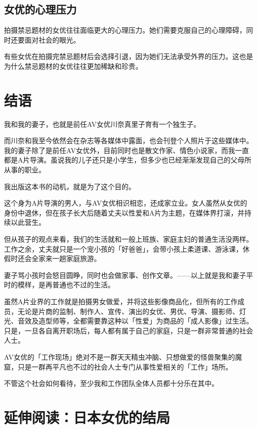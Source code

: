\documentclass[12pt,UTF8]{ctexbook}
\begin{document}
\section{女优的心理压力}

拍摄禁忌题材的女优往往面临更大的心理压力。她们需要克服自己的心理障碍，同时还要面对社会的眼光。

有些女优在拍摄完禁忌题材后会选择引退，因为她们无法承受外界的压力。这也是为什么禁忌题材的女优往往更加稀缺和珍贵。

\backmatter

\chapter{结语}

我和我的妻子，也就是前任AV女优川奈真里子育有一个独生子。

而川奈和我至今依然会在杂志等各媒体中露面，也会刊登个人照片于这些媒体中。我的妻子除了是前任AV女优外，目前同时也是散文作家、情色小说家，而我一直都是A片导演。虽说我的儿子还只是小学生，但多少也已经渐渐发现自己的父母所从事的职业。

我出版这本书的动机，就是为了这个目的。

这个身为A片导演的男人，与AV女优相识相恋，还成家立业。女人虽然从女优的身份中退休，但在孩子长大后随着丈夫以性爱和A片为主题，在媒体界打滚，并持续以此营生。

但从孩子的观点来看，我们的生活就和一般上班族、家庭主妇的普通生活没两样。工作之余，丈夫就只是一个宠小孩的「好爸爸」，会带小孩上柔道课、游泳课，休假时还会全家来一趟家庭旅游。

妻子骂小孩时会怒目圆睁，同时也会做家事、创作文章。——以上就是我和妻子平时的模样，是再普通也不过的生活。

虽然A片业界的工作就是拍摄男女做爱，并将这些影像商品化，但所有的工作成员，无论是片商的监制、制作人、宣传、演出的女优、男优、导演、摄影师、灯光、音效及造型师等，全都需要靠这种以「性爱」为商品的「成人影像」过生活。只是，一旦各自离开职场后，每人都有属于自己的家庭，只是一群非常普通的社会人士。

AV女优的「工作现场」绝对不是一群天天精虫冲脑、只想做爱的怪兽聚集的魔窟，只是一群再平凡也不过的社会人士专门从事性爱相关的「工作」场所。

不管这个社会如何看待，至少我和工作团队全体人员都十分乐在其中。

\chapter{延伸阅读：日本女优的结局}
\end{document}
